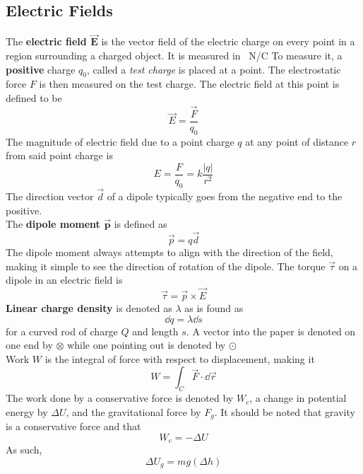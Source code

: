 \documentclass[./Electricity and Magnetism.tex]{subfiles}
\begin{document}
		\subsection{Electric Fields}
			The \textbf{electric field \(\bm{\vec{E}}\)} is the vector field of the electric charge on every point in a region surrounding a charged object. It is measured in \SI{}{N/C} To measure it, a \textbf{positive} charge \(q_0\), called a \textit{test charge} is placed at a point. The electrostatic force \(F\) is then measured on the test charge. The electric field at this point is defined to be
				\[\vec{E} = \frac{\vec{F}}{q_0}\]
				The magnitude of electric field due to a point charge \(q\) at any point of distance \(r\) from said point charge is
				\[E = \frac{F}{q_0} = k\frac{|q|}{r^2}\]
			The direction vector \(\vec{d}\) of a dipole typically goes from the negative end to the positive. \\
			The \textbf{dipole moment \(\bm{\vec{p}}\)} is defined as
				\[\vec{p} = q\vec{d}\]
				The dipole moment always attempts to align with the direction of the field, making it simple to see the direction of rotation of the dipole.
			The torque \(\vec{\tau}\) on a dipole in an electric field is
				\[\vec{\tau} = \vec{p} \times \vec{E}\]
			\textbf{Linear charge density} is denoted as \(\lambda\) as is found as
				\[\dd{q} = \lambda \dd{s}\]
				for a curved rod of charge \(Q\) and length \(s\).
			A vector into the paper is denoted on one end by \(\otimes\) while one pointing out is denoted by \(\odot\) \\
			Work \(W\) is the integral of force with respect to displacement, making it
				\[W = \int_C \vec{F} \cdot \dd{\vec{r}}\]
				The work done by a conservative force is denoted by \(W_c\), a change in potential energy by \(\Delta U\), and the gravitational force by \(F_g\). It should be noted that gravity is a conservative force and that
				\[W_c = -\Delta U\]
				As such,
				\[\Delta U_g = mg(\Delta h)\]
\end{document}
